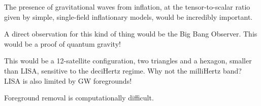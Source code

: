 \documentclass[main.tex]{subfiles}
\begin{document}
The presence of gravitational waves from inflation, at the tensor-to-scalar ratio given by simple, single-field inflationary models, would be incredibly important. 

A direct observation for this kind of thing would be the Big Bang Observer. 
This would be a proof of quantum gravity! 

This would be a 12-satellite configuration, two triangles and a hexagon, smaller than LISA, sensitive to the deciHertz regime. 
Why not the milliHertz band? LISA is also limited by GW foregrounds! 

Foreground removal is computationally difficult. 
\end{document}
